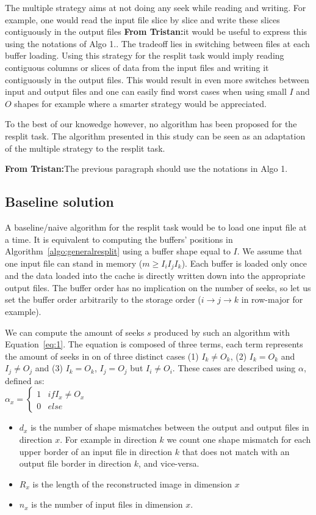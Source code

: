 \documentclass[conference]{IEEEtran}
\newcommand{\tristan}[1]{\color{orange}\textbf{From Tristan:}#1\color{black}}
\begin{document}
The multiple strategy aims at not doing any seek while reading and writing. For
example, one would read the input file slice by slice and write these slices
contiguously in the output files \tristan{it would be useful to express this using the notations of Algo 1.}. The tradeoff lies in switching between files
at each buffer loading. Using this strategy for the resplit task would imply
reading contiguous columns or slices of data from the input files and writing it
contiguously in the output files. This would result in even more switches
between input and output files and one can easily find worst cases when using
small $I$ and $O$ shapes for example where a smarter strategy would be appreciated.

To the best of our knowedge however, no algorithm has been proposed for the
resplit task. The algorithm presented in this study can be seen as an
adaptation of the multiple strategy to the resplit task.

\tristan{The previous paragraph should use the notations in Algo 1.}

\subsection{Baseline solution}

A baseline/naive algorithm for the resplit task would be to load one input file
at a time. It is equivalent to computing the buffers' positions in
Algorithm~\ref{algo:generalresplit} using a buffer shape equal to $I$.
We assume that one input file can stand in memory ($m \geq I_iI_jI_k$). Each
buffer is loaded only once and the data loaded into the cache is directly
written down into the appropriate output files. The buffer order has no
implication on the number of seeks, so let us set the buffer order arbitrarily
to the storage order ($i \rightarrow j \rightarrow k$ in row-major for example).

We can compute the amount of seeks $s$ produced by such an algorithm with
Equation~\ref{eq:1}. The equation is composed of three terms, each term represents
the amount of seeks in on of three distinct cases (1) $I_k \neq O_k$, (2)
$I_k = O_k$ and $I_j \neq O_j$ and (3) $I_k = O_k$, $I_j = O_j$ but $I_i \neq O_i$.
These cases are described using $\alpha$, defined as: \\
$\alpha_x = \begin{cases}
   1 & if I_x \neq O_x \\
   0 & else
\end{cases}$
\begin{itemize}
  \item $d_x$ is the number of shape mismatches between the output and output files
  in direction $x$. For example in direction $k$ we count one shape mismatch for
  each upper border of an input file in direction $k$ that does not match with
  an output file border in direction $k$, and vice-versa.
  \item $R_x$ is the length of the reconstructed image in dimension $x$
  \item $n_x$ is the number of input files in dimension $x$.
\end{itemize}
\end{document}

